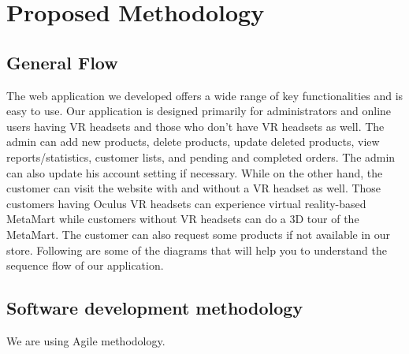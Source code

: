 \newpage

\begingroup%
\makeatletter%
\let\clearpage\relax%
\vspace*{\fill}%
\vspace*{\dimexpr-50\p@-\baselineskip}%
\chapterfont{\centering}
\chapter{Proposed Methodology}
\vspace*{\fill}%
\endgroup

\newpage
\label{Chapter3}

\section{General Flow}
The web application we developed offers a wide range of key functionalities and is
easy to use. Our application is designed primarily for administrators and online
users having VR headsets and those who don't have VR headsets as well. The admin can add new products, delete products, update deleted products, view reports/statistics, customer lists, and pending and completed orders. The admin can also update his account setting if necessary. While on the other hand, the customer can visit the website with and without a VR headset as well. Those customers having Oculus VR headsets can experience virtual reality-based MetaMart while customers without VR headsets can do a 3D tour of the MetaMart. The customer can also request some products if not available in our store. Following are some of the diagrams that will help you to understand the sequence flow of our application.
\section{Software development methodology}
We are using Agile methodology.

